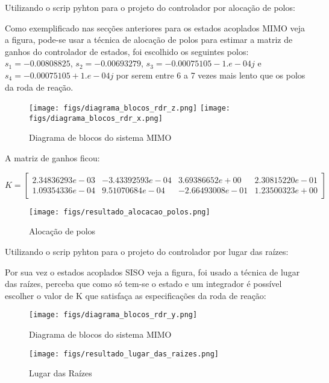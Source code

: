 Utilizando o scrip pyhton para o projeto do controlador por alocação de polos:

Como exemplificado nas secções anteriores para os estados acoplados MIMO veja a figura, pode-se usar a técnica de alocação de polos para estimar a matriz de ganhos do controlador de estados, foi escolhido os seguintes polos:
$s_1 = -0.00808825$, $s_2=-0.00693279$, $s_3=-0.00075105-1.e-04j$ e $s_4=-0.00075105+1.e-04j$ por serem entre 6 a 7 vezes mais lento que os polos da roda de reação.

\begin{figure}[htpb]
	\centering
	\texttt{[image: figs/diagrama\_blocos\_rdr\_z.png]}
	\texttt{[image: figs/diagrama\_blocos\_rdr\_x.png]}
	\caption{Diagrama de blocos do sistema MIMO}
	\label{fig:15}
\end{figure}


A matriz de ganhos ficou: 

\begin{equation}
	K = \begin{bmatrix}
		 2.34836293e-03 & -3.43392593e-04 & 3.69386652e+00 & 2.30815220e-01 \\
		 1.09354336e-04 & 9.51070684e-04 & -2.66493008e-01 & 1.23500323e+00
	\end{bmatrix}
\end{equation}


\begin{figure}[htpb]
	\centering
	\texttt{[image: figs/resultado\_alocacao\_polos.png]}
	\caption{Alocação de polos}
	\label{fig:15}
\end{figure}

Utilizando o scrip pyhton para o projeto do controlador por lugar das raízes:

Por sua vez o estados acoplados SISO veja a figura, foi usado a técnica de lugar das raízes, perceba que como só tem-se o estado e um integrador é possível escolher o valor de K que satisfaça as especificações da roda de reação:

\begin{figure}[htpb]
	\centering
	\texttt{[image: figs/diagrama\_blocos\_rdr\_y.png]}
	\caption{Diagrama de blocos do sistema MIMO}
	\label{fig:15}
\end{figure}

\begin{figure}[htpb]
	\centering
	\texttt{[image: figs/resultado\_lugar\_das\_raizes.png]}
	\caption{Lugar das Raízes}
	\label{fig:15}
\end{figure}



